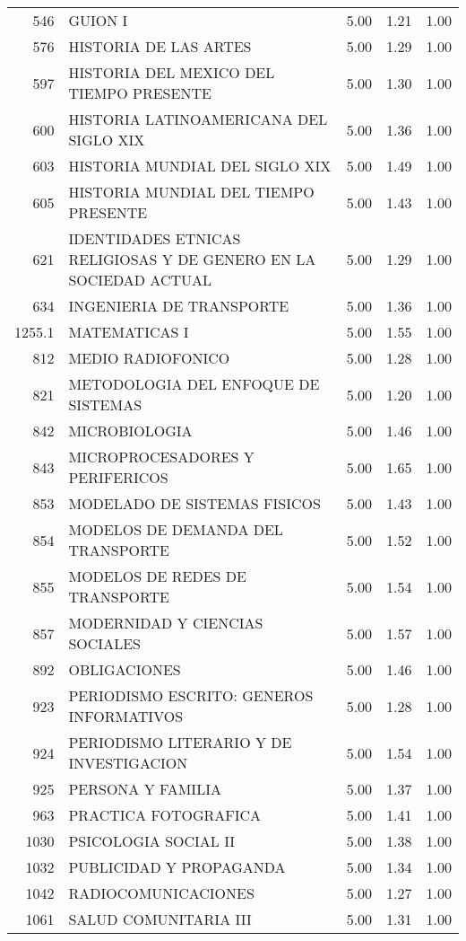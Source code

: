 \begin{table}[ht]
\begin{tabular}{rlrrr}
  546 & GUION I & 5.00 & 1.21 & 1.00 \\ 
  576 & HISTORIA DE LAS ARTES & 5.00 & 1.29 & 1.00 \\ 
  597 & HISTORIA DEL MEXICO DEL TIEMPO PRESENTE & 5.00 & 1.30 & 1.00 \\ 
  600 & HISTORIA LATINOAMERICANA DEL SIGLO XIX & 5.00 & 1.36 & 1.00 \\ 
  603 & HISTORIA MUNDIAL DEL SIGLO XIX & 5.00 & 1.49 & 1.00 \\ 
  605 & HISTORIA MUNDIAL DEL TIEMPO PRESENTE & 5.00 & 1.43 & 1.00 \\ 
  621 & IDENTIDADES ETNICAS RELIGIOSAS Y DE GENERO EN LA SOCIEDAD ACTUAL & 5.00 & 1.29 & 1.00 \\ 
  634 & INGENIERIA DE TRANSPORTE & 5.00 & 1.36 & 1.00 \\ 
  1255.1 & MATEMATICAS I & 5.00 & 1.55 & 1.00 \\ 
  812 & MEDIO RADIOFONICO & 5.00 & 1.28 & 1.00 \\ 
  821 & METODOLOGIA DEL ENFOQUE DE SISTEMAS & 5.00 & 1.20 & 1.00 \\ 
  842 & MICROBIOLOGIA & 5.00 & 1.46 & 1.00 \\ 
  843 & MICROPROCESADORES Y PERIFERICOS & 5.00 & 1.65 & 1.00 \\ 
  853 & MODELADO DE SISTEMAS FISICOS & 5.00 & 1.43 & 1.00 \\ 
  854 & MODELOS DE DEMANDA DEL TRANSPORTE & 5.00 & 1.52 & 1.00 \\ 
  855 & MODELOS DE REDES DE TRANSPORTE & 5.00 & 1.54 & 1.00 \\ 
  857 & MODERNIDAD Y CIENCIAS SOCIALES & 5.00 & 1.57 & 1.00 \\ 
  892 & OBLIGACIONES & 5.00 & 1.46 & 1.00 \\ 
  923 & PERIODISMO ESCRITO: GENEROS INFORMATIVOS & 5.00 & 1.28 & 1.00 \\ 
  924 & PERIODISMO LITERARIO Y DE INVESTIGACION & 5.00 & 1.54 & 1.00 \\ 
  925 & PERSONA Y FAMILIA & 5.00 & 1.37 & 1.00 \\ 
  963 & PRACTICA FOTOGRAFICA & 5.00 & 1.41 & 1.00 \\ 
  1030 & PSICOLOGIA SOCIAL II & 5.00 & 1.38 & 1.00 \\ 
  1032 & PUBLICIDAD Y PROPAGANDA & 5.00 & 1.34 & 1.00 \\ 
  1042 & RADIOCOMUNICACIONES & 5.00 & 1.27 & 1.00 \\ 
  1061 & SALUD COMUNITARIA III & 5.00 & 1.31 & 1.00 \\ 

\end{tabular}
\end{table}
